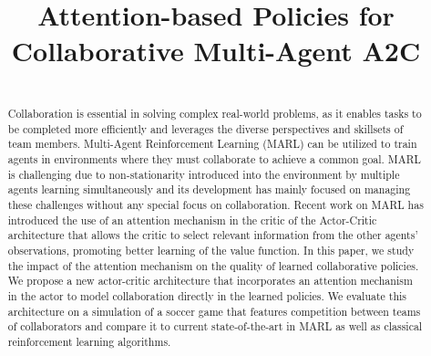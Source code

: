\documentclass[conference]{IEEEtran}
\begin{document}
\title{Attention-based Policies for Collaborative Multi-Agent A2C}

\author{
\and
{}
}

\maketitle


\begin{abstract}\\

Collaboration is essential in solving complex real-world problems, as it enables tasks to be completed more efficiently and leverages the diverse perspectives and skillsets of team members.
Multi-Agent Reinforcement Learning (MARL) can be utilized to train agents in environments where they must collaborate to achieve a common goal. 
MARL is challenging due to non-stationarity introduced into the environment by multiple agents learning simultaneously and its development has mainly focused on managing these challenges without any special focus on collaboration. 
Recent work on MARL has introduced the use of an attention mechanism in the critic of the Actor-Critic architecture that allows the critic to select relevant information from the other agents' observations, promoting better learning of the value function.
In this paper, we study the impact of the attention mechanism on the quality of learned collaborative policies. 
We propose a new actor-critic architecture that incorporates an attention mechanism in the actor to model collaboration directly in the learned policies.  
We evaluate this architecture on a simulation of a soccer game that features competition between teams of collaborators and compare it to current state-of-the-art in MARL as well as classical reinforcement learning algorithms.
\end{abstract}
\end{document}
